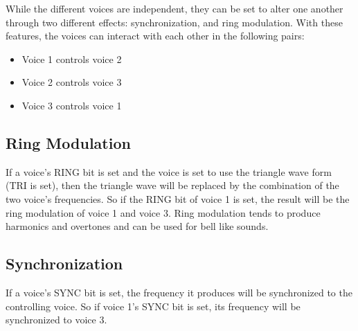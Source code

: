 While the different voices are independent, they can be set to alter one another through two different effects: synchronization, and ring modulation. With these features, the voices can interact with each other in the following pairs:

\begin{itemize}
\item Voice 1 controls voice 2
\item Voice 2 controls voice 3
\item Voice 3 controls voice 1
\end{itemize}

\subsection{Ring Modulation}

If a voice's RING bit is set and the voice is set to use the triangle wave form (TRI is set), then the triangle wave will be replaced by the combination of the two voice's frequencies. So if the RING bit of voice 1 is set, the result will be the ring modulation of voice 1 and voice 3. Ring modulation tends to produce harmonics and overtones and can be used for bell like sounds.

\subsection{Synchronization}

If a voice's SYNC bit is set, the frequency it produces will be synchronized to the controlling voice. So if voice 1's SYNC bit is set, its frequency will be synchronized to voice 3.

